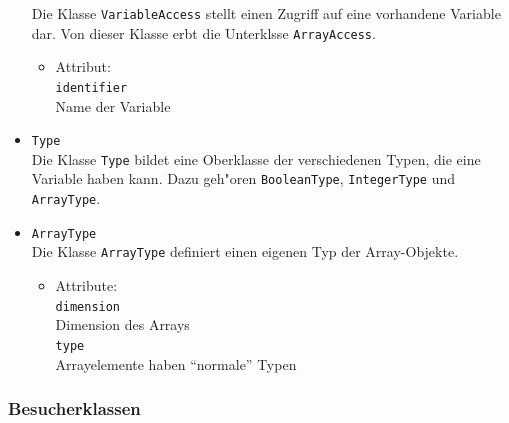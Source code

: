 \documentclass[10pt,a4paper,titlepage]{article}
\begin{document}
\begin{itemize}
Die Klasse \texttt{VariableAccess} stellt einen Zugriff auf eine vorhandene Variable dar. Von dieser Klasse erbt die Unterklsse \texttt{ArrayAccess}. 
\begin{itemize}
\item Attribut: \\
\texttt{identifier} \\
Name der Variable 
\end{itemize}
\item \texttt{Type} \\
Die Klasse \texttt{Type} bildet eine Oberklasse der verschiedenen Typen, die eine Variable haben kann. Dazu geh"oren \texttt{BooleanType}, \texttt{IntegerType} und \texttt{ArrayType}.
\item \texttt{ArrayType} \\
Die Klasse \texttt{ArrayType} definiert einen eigenen Typ der Array-Objekte. 
\begin{itemize}
\item Attribute: \\
\texttt{dimension} \\
Dimension des Arrays \\
\texttt{type} \\
Arrayelemente haben "`normale"' Typen \\
\end{itemize}
\end{itemize}

\subsubsection{Besucherklassen}
\end{document}
